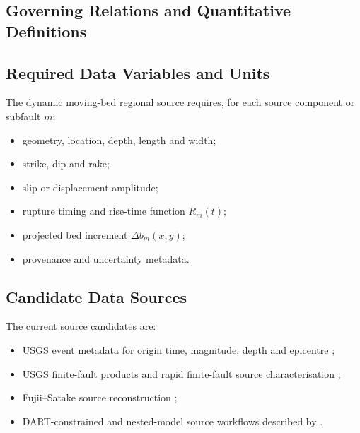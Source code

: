 \subsection{Governing Relations and Quantitative Definitions}
\label{sec:res-dat-src-governing-relations}

%

\subsection{Required Data Variables and Units}
\label{sec:res-dat-src-required-data-variables-units}

The dynamic moving-bed regional source requires, for each source
component or subfault $m$:

\begin{itemize}
  \item geometry, location, depth, length and width;
  \item strike, dip and rake;
  \item slip or displacement amplitude;
  \item rupture timing and rise-time function $R_m(t)$;
  \item projected bed increment $\Delta b_m(x,y)$;
  \item provenance and uncertainty metadata.
\end{itemize}

\subsection{Candidate Data Sources}
\label{sec:res-dat-src-candidate-data-sources}

The current source candidates are:

\begin{itemize}
  \item USGS event metadata for origin time, magnitude, depth and
    epicentre \parencite{usgs2011tohokuEvent};
  \item USGS finite-fault products and rapid finite-fault source
    characterisation \parencite{usgsFiniteFaults,hayes2011rapid};
  \item Fujii--Satake source reconstruction
    \parencite{fujii2011tsunamisource};
  \item DART-constrained and nested-model source workflows described
    by \textcite{wei2013japan}.
\end{itemize}

